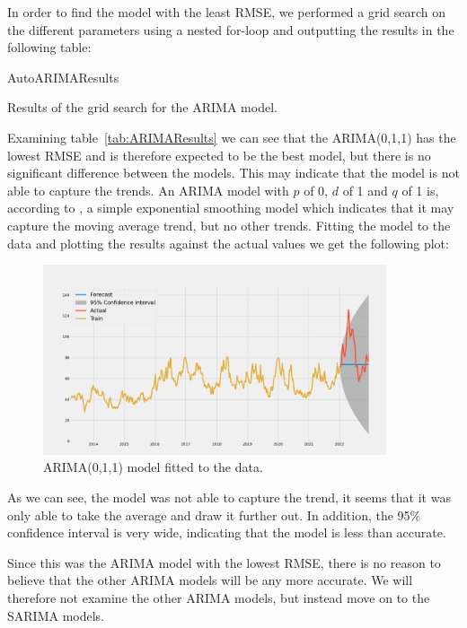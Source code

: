 In order to find the model with the least RMSE, we performed a grid search on the different parameters using a nested for-loop and outputting the results in the following table: 
\begin{table}[H]
    \begin{center}
        {AutoARIMAResults}
        \caption{Results of the grid search for the ARIMA model.}\label{tab:ARIMAResults}
    \end{center}
\end{table}
Examining table~\ref{tab:ARIMAResults} we can see that the ARIMA(0,1,1) has the lowest RMSE and is therefore expected to be the best model, but there is no significant difference between the models. This may indicate that the model is not able to capture the trends. An ARIMA model with $p$ of 0, $d$ of 1 and $q$ of 1 is, according to \textcite{nau_2019}, a simple exponential smoothing model which indicates that it may capture the moving average trend, but no other trends. Fitting the model to the data and plotting the results against the actual values we get the following plot:
\begin{figure}[H]
    \begin{center}
        \includegraphics[width=0.9\textwidth]{data/Figures/ARIMA/ARIMA_0_1_1.png}
        \caption{ARIMA(0,1,1) model fitted to the data.}\label{fig:ARIMA_011}
    \end{center}
\end{figure}
As we can see, the model was not able to capture the trend, it seems that it was only able to take the average and draw it further out. In addition, the 95\% confidence interval is very wide, indicating that the model is less than accurate.

Since this was the ARIMA model with the lowest RMSE, there is no reason to believe that the other ARIMA models will be any more accurate. We will therefore not examine the other ARIMA models, but instead move on to the SARIMA models.

